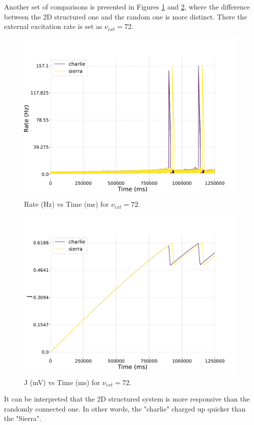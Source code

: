 \documentclass[a4paper,12pt]{article}
\begin{document}
Another set of comparisons is presented in Figures \ref{charlie72ratevstime} and \ref{charlie72alphavstime}, where the difference between the 2D structured one and the random one is more distinct. There the external excitation rate is set as $\nu_{ext} =  72.$
\begin{figure}[htb!] 
    \centering
    \includegraphics[width=\linewidth]{nu_ext_72rate_over_time_homeostasis.pdf}
    \caption{Rate (Hz) vs Time (ms) for $\nu_{ext} = 72$.}
    \label{charlie72ratevstime}
\end{figure}
\begin{figure}[htb!] 
    \centering
    \includegraphics[width=\linewidth]{nu_ext_72alpha_over_time_homeostasis.pdf}
    \caption{J (mV) vs Time (ms) for $\nu_{ext} = 72$.}
    \label{charlie72alphavstime}
\end{figure}
It can be interpreted that the 2D structured system is more responsive than the randomly connected one. In other words, the "charlie" charged up quicker than the "Sierra".
\end{document}
